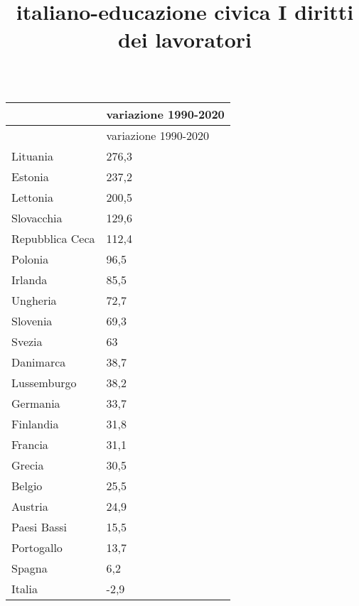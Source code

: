 \documentclass[
]{article}
\title{italiano-educazione civica I diritti dei lavoratori}
\author{}
\date{}
\begin{document}
\maketitle

\begin{longtable}[]{@{}ll@{}}
\caption{}\label{tablepress-3194}\tabularnewline
\toprule\noalign{}
& variazione 1990-2020 \\
\midrule\noalign{}
\endfirsthead
\toprule\noalign{}
& variazione 1990-2020 \\
\midrule\noalign{}
\endhead
\bottomrule\noalign{}
\endlastfoot
Lituania & 276,3 \\
Estonia & 237,2 \\
Lettonia & 200,5 \\
Slovacchia & 129,6 \\
Repubblica Ceca & 112,4 \\
Polonia & 96,5 \\
Irlanda & 85,5 \\
Ungheria & 72,7 \\
Slovenia & 69,3 \\
Svezia & 63 \\
Danimarca & 38,7 \\
Lussemburgo & 38,2 \\
Germania & 33,7 \\
Finlandia & 31,8 \\
Francia & 31,1 \\
Grecia & 30,5 \\
Belgio & 25,5 \\
Austria & 24,9 \\
Paesi Bassi & 15,5 \\
Portogallo & 13,7 \\
Spagna & 6,2 \\
Italia & -2,9 \\
\end{longtable}
\end{document}
